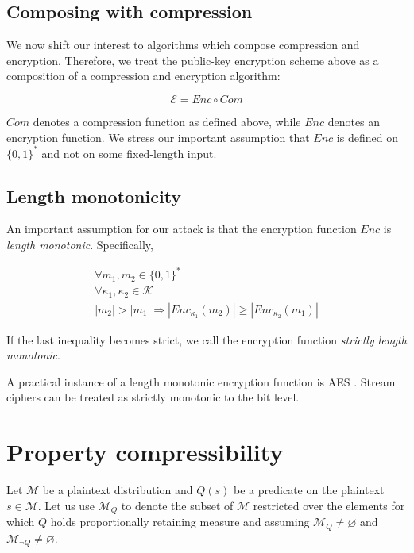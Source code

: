 \documentclass{sig-alternate-05-2015}
\let\emptyset\varnothing
\begin{document}
\subsection{Composing with compression}\label{subsec:comcompose}

We now shift our interest to algorithms which compose compression and
encryption.  Therefore, we treat the public-key encryption scheme above as a
composition of a compression and encryption algorithm:

\begin{equation*}
    \mathcal{E} = Enc \circ Com
\end{equation*}

$Com$ denotes a compression function as defined above, while $Enc$ denotes an
encryption function. We stress our important assumption that $Enc$ is defined
on $\{0, 1\}^*$ and not on some fixed-length input.

\subsection{Length monotonicity}\label{subsec:lenmonotone}

An important assumption for our attack is that the encryption function $Enc$ is
\textit{length monotonic}. Specifically,

\begin{equation*}
\begin{split}
\forall m_1, m_2 \in \{0, 1\}^*\\
\forall \kappa_1, \kappa_2 \in \mathcal{K}\\
|m_2| > |m_1|
\Rightarrow
|Enc_{\kappa_1}(m_2)| \geq |Enc_{\kappa_2}(m_1)|
\end{split}
\end{equation*}

If the last inequality becomes strict, we call the encryption function
\textit{strictly length monotonic}.

A practical instance of a length monotonic encryption function is AES \cite{c4}.
Stream ciphers can be treated as strictly monotonic to the bit level.

\section{Property compressibility}\label{sec:propertycom}

Let $\mathcal{M}$ be a plaintext distribution and $Q(s)$ be a predicate on the
plaintext $s \in \mathcal{M}$. Let us use $\mathcal{M}_Q$ to denote the subset
of $\mathcal{M}$ restricted over the elements for which $Q$ holds
proportionally retaining measure and assuming $\mathcal{M}_Q \neq \emptyset$
and $\mathcal{M}_{\lnot Q} \neq \emptyset$.
\end{document}
